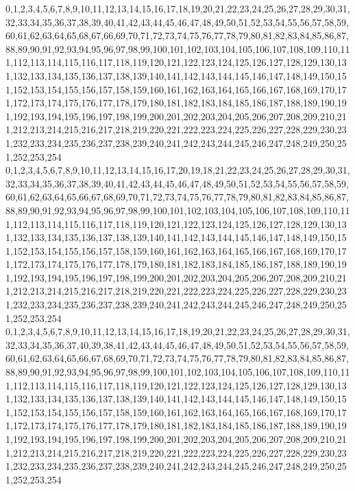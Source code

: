 \documentclass[12pt]{article}
\begin{document}
{0,1,2,3,4,5,6,7,8,9,10,11,12,13,14,15,16,17,18,19,20,21,22,23,24,25,26,27,28,29,30,31,32,33,34,35,36,37,38,39,40,41,42,43,44,45,46,47,48,49,50,51,52,53,54,55,56,57,58,59,60,61,62,63,64,65,68,67,66,69,70,71,72,73,74,75,76,77,78,79,80,81,82,83,84,85,86,87,88,89,90,91,92,93,94,95,96,97,98,99,100,101,102,103,104,105,106,107,108,109,110,111,112,113,114,115,116,117,118,119,120,121,122,123,124,125,126,127,128,129,130,131,132,133,134,135,136,137,138,139,140,141,142,143,144,145,146,147,148,149,150,151,152,153,154,155,156,157,158,159,160,161,162,163,164,165,166,167,168,169,170,171,172,173,174,175,176,177,178,179,180,181,182,183,184,185,186,187,188,189,190,191,192,193,194,195,196,197,198,199,200,201,202,203,204,205,206,207,208,209,210,211,212,213,214,215,216,217,218,219,220,221,222,223,224,225,226,227,228,229,230,231,232,233,234,235,236,237,238,239,240,241,242,243,244,245,246,247,248,249,250,251,252,253,254\\
0,1,2,3,4,5,6,7,8,9,10,11,12,13,14,15,16,17,20,19,18,21,22,23,24,25,26,27,28,29,30,31,32,33,34,35,36,37,38,39,40,41,42,43,44,45,46,47,48,49,50,51,52,53,54,55,56,57,58,59,60,61,62,63,64,65,66,67,68,69,70,71,72,73,74,75,76,77,78,79,80,81,82,83,84,85,86,87,88,89,90,91,92,93,94,95,96,97,98,99,100,101,102,103,104,105,106,107,108,109,110,111,112,113,114,115,116,117,118,119,120,121,122,123,124,125,126,127,128,129,130,131,132,133,134,135,136,137,138,139,140,141,142,143,144,145,146,147,148,149,150,151,152,153,154,155,156,157,158,159,160,161,162,163,164,165,166,167,168,169,170,171,172,173,174,175,176,177,178,179,180,181,182,183,184,185,186,187,188,189,190,191,192,193,194,195,196,197,198,199,200,201,202,203,204,205,206,207,208,209,210,211,212,213,214,215,216,217,218,219,220,221,222,223,224,225,226,227,228,229,230,231,232,233,234,235,236,237,238,239,240,241,242,243,244,245,246,247,248,249,250,251,252,253,254\\
0,1,2,3,4,5,6,7,8,9,10,11,12,13,14,15,16,17,18,19,20,21,22,23,24,25,26,27,28,29,30,31,32,33,34,35,36,37,40,39,38,41,42,43,44,45,46,47,48,49,50,51,52,53,54,55,56,57,58,59,60,61,62,63,64,65,66,67,68,69,70,71,72,73,74,75,76,77,78,79,80,81,82,83,84,85,86,87,88,89,90,91,92,93,94,95,96,97,98,99,100,101,102,103,104,105,106,107,108,109,110,111,112,113,114,115,116,117,118,119,120,121,122,123,124,125,126,127,128,129,130,131,132,133,134,135,136,137,138,139,140,141,142,143,144,145,146,147,148,149,150,151,152,153,154,155,156,157,158,159,160,161,162,163,164,165,166,167,168,169,170,171,172,173,174,175,176,177,178,179,180,181,182,183,184,185,186,187,188,189,190,191,192,193,194,195,196,197,198,199,200,201,202,203,204,205,206,207,208,209,210,211,212,213,214,215,216,217,218,219,220,221,222,223,224,225,226,227,228,229,230,231,232,233,234,235,236,237,238,239,240,241,242,243,244,245,246,247,248,249,250,251,252,253,254\\
}
\end{document}
